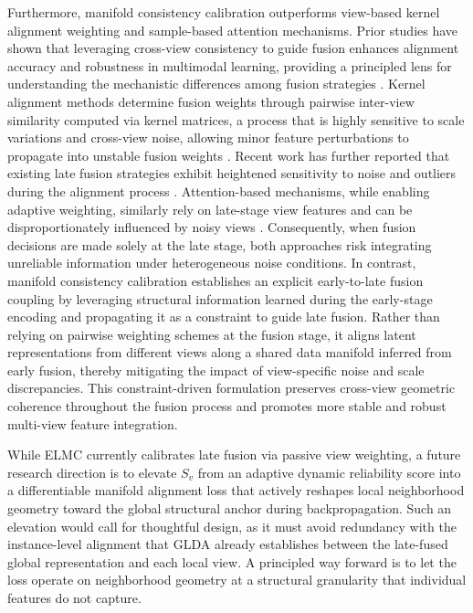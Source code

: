 \documentclass[10pt, journal, compsoc]{IEEEtran}
\newif\ifshowrevision
\newenvironment{revpar}{%
  \ifshowrevision
    \color{blue}%
  \fi
}{}
\begin{document}

Furthermore, manifold consistency calibration outperforms view-based kernel alignment weighting and sample-based attention mechanisms. Prior studies have shown that leveraging cross-view consistency to guide fusion enhances alignment accuracy and robustness in multimodal learning, providing a principled lens for understanding the mechanistic differences among fusion strategies \cite{yin2025semi}. Kernel alignment methods determine fusion weights through pairwise inter-view similarity computed via kernel matrices, a process that is highly sensitive to scale variations and cross-view noise, allowing minor feature perturbations to propagate into unstable fusion weights \cite{zhang2022fusion}. Recent work has further reported that existing late fusion strategies exhibit heightened sensitivity to noise and outliers during the alignment process \cite{yang2025mmlf}. Attention-based mechanisms, while enabling adaptive weighting, similarly rely on late-stage view features and can be disproportionately influenced by noisy views \cite{park2022manner}. Consequently, when fusion decisions are made solely at the late stage, both approaches risk integrating unreliable information under heterogeneous noise conditions. In contrast, manifold consistency calibration establishes an explicit early-to-late fusion coupling by leveraging structural information learned during the early-stage encoding and propagating it as a constraint to guide late fusion. Rather than relying on pairwise weighting schemes at the fusion stage, it aligns latent representations from different views along a shared data manifold inferred from early fusion, thereby mitigating the impact of view-specific noise and scale discrepancies. This constraint-driven formulation preserves cross-view geometric coherence throughout the fusion process and promotes more stable and robust multi-view feature integration.

\begin{revpar}While ELMC currently calibrates late fusion via passive view weighting, a future research direction is to elevate $S_v$ from an adaptive dynamic reliability score into a differentiable manifold alignment loss that actively reshapes local neighborhood geometry toward the global structural anchor during backpropagation.
Such an elevation would call for thoughtful design, as it must avoid redundancy with the instance-level alignment that GLDA already establishes between the late-fused global representation and each local view. A principled way forward is to let the loss operate on neighborhood geometry at a structural granularity that individual features do not capture.\end{revpar}
\end{document}
